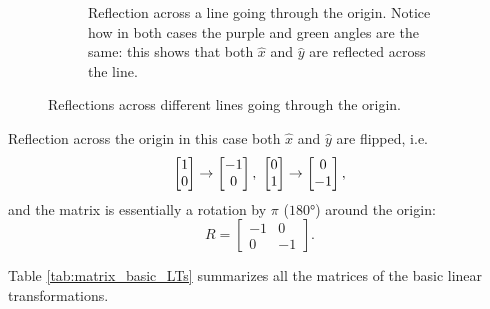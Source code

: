 \begin{descitemize}
\begin{figure}
\begin{subfigure}[c]{0.45\textwidth}
\begin{center}
			\end{center}
			\caption{Reflection across a line going through the origin. Notice how in both cases the purple and green angles are the same: this shows that both $\hat{x}$ and $\hat{y}$ are reflected across the line.}
			\label{fig:ref_line}
			\end{subfigure}
			\caption{Reflections across different lines going through the origin.}
			\label{fig:reflections}
		\end{figure}
		
	\item[Reflection across the origin] in this case both $\hat{x}$ and $\hat{y}$ are flipped, i.e.
		\[
			\colvec{1;0}\to\colvec{-1;0},\ \colvec{0;1}\to\colvec{0;-1},
		\]
		and the matrix is essentially a rotation by $\pi$ ($\ang{180}$) around the origin:
		\begin{equation}
			R = \begin{bmatrix} -1&0 \\ 0&-1 \end{bmatrix}.
			\label{eq:}
		\end{equation}
\end{descitemize}

Table \autoref{tab:matrix_basic_LTs} summarizes all the matrices of the basic linear transformations.

